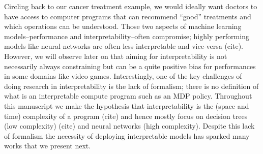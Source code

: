 Circling back to our cancer treatment example, we would ideally want doctors to have access to computer programs that can recommend ``good'' treatments and which operations can be understood. Those two aspects of machine learning models--performance and interpretability--often compromise; highly performing models like neural networks are often less interpretable and vice-versa (cite).
However, we will observe later on that aiming for interpretability is not necessarily always constraining but can be a quite positive bias for performances in some domains like video games.
Interestingly, one of the key challenges of doing research in interpretability is the lack of formalism; there is no definition of what is an interpretable compute program such as an MDP policy. Throughout this manuscript we make the hypothesis that interpretability is the (space and time) complexity of a program (cite) and hence mostly focus on decision trees (low complexity) (cite) and neural networks (high complexity).  
Despite this lack of formalism the necessity of deploying interpretable models has sparked many works that we present next.
